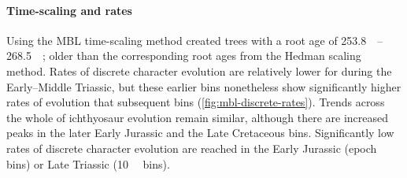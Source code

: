 \documentclass[british,a4paper]{article}
\newcommand\pcref[1]{(\cref{#1})}
\begin{document}
\paragraph{Time-scaling and rates}\label{par:mbl-scaling-rates}

Using the MBL time-scaling method created trees with a root age of
\SIrange{253.8}{268.5}{\mega\annum}; older than the corresponding root ages from
the Hedman scaling method. Rates of discrete character evolution are relatively
lower for during the Early–Middle Triassic, but these earlier bins nonetheless
show significantly higher rates of evolution that subsequent bins
\pcref{fig:mbl-discrete-rates}. Trends across the whole of ichthyosaur evolution
remain similar, although there are increased peaks in the later Early Jurassic
and the Late Cretaceous bins. Significantly low rates of discrete character
evolution are reached in the Early Jurassic (epoch bins) or Late Triassic
(\SI{10}{\mega\annum} bins).

\printbibliography
\end{document}
